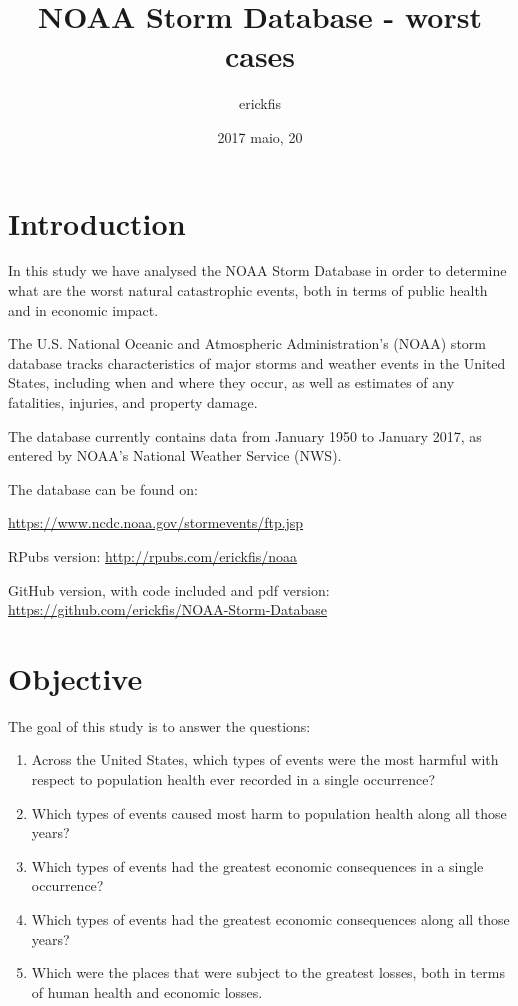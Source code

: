 \documentclass[]{article}
\title{NOAA Storm Database - worst cases}
\author{erickfis}
\date{2017 maio, 20}
\begin{document}
\maketitle

{
\setcounter{tocdepth}{3}
\tableofcontents
}
\section{Introduction}\label{introduction}

In this study we have analysed the NOAA Storm Database in order to
determine what are the worst natural catastrophic events, both in terms
of public health and in economic impact.

The U.S. National Oceanic and Atmospheric Administration's (NOAA) storm
database tracks characteristics of major storms and weather events in
the United States, including when and where they occur, as well as
estimates of any fatalities, injuries, and property damage.

The database currently contains data from January 1950 to January 2017,
as entered by NOAA's National Weather Service (NWS).

The database can be found on:

\url{https://www.ncdc.noaa.gov/stormevents/ftp.jsp}

RPubs version: \url{http://rpubs.com/erickfis/noaa}

GitHub version, with code included and pdf version:
\url{https://github.com/erickfis/NOAA-Storm-Database}

\section{Objective}\label{objective}

The goal of this study is to answer the questions:

\begin{enumerate}
\def\labelenumi{\arabic{enumi}.}
\item
  Across the United States, which types of events were the most harmful
  with respect to population health ever recorded in a single
  occurrence?
\item
  Which types of events caused most harm to population health along all
  those years?
\item
  Which types of events had the greatest economic consequences in a
  single occurrence?
\item
  Which types of events had the greatest economic consequences along all
  those years?
\item
  Which were the places that were subject to the greatest losses, both
  in terms of human health and economic losses.
\end{enumerate}
\end{document}
